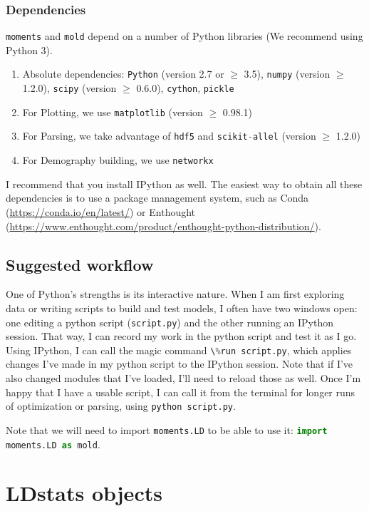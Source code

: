 \documentclass[10pt]{article}
\makeatletter
\renewcommand{\cite}{\citep}
\newcommand{\mold}{\texttt{mold}\xspace}
\newcommand{\py}[1]{\lstinline[breaklines=true,language=Python, showstringspaces=False]@#1@}
\makeatother
\begin{document}
\subsubsection{Dependencies}

\py{moments} and \mold depend on a number of Python libraries (We recommend using Python 3).

\begin{enumerate}
\item Absolute dependencies: \py{Python} (version 2.7 or $\geq$ 3.5), \py{numpy} (version $\geq$ 1.2.0), \py{scipy} (version $\geq$ 0.6.0), \py{cython}, \py{pickle}
\item For Plotting, we use \py{matplotlib} (version $\geq$ 0.98.1)
\item For Parsing, we take advantage of \py{hdf5} and \py{scikit-allel} (version $\geq$ 1.2.0) \cite{}
\item For Demography building, we use \py{networkx}
\end{enumerate}

I recommend that you install IPython as well.
The easiest way to obtain all these dependencies is to use a package management system, such as Conda (\url{https://conda.io/en/latest/}) or Enthought (\url{https://www.enthought.com/product/enthought-python-distribution/}).


\subsection{Suggested workflow}

One of Python's strengths is its interactive nature.
When I am first exploring data or writing scripts to build and test models, I often have two windows open: one editing a python script (\py{script.py}) and the other running an IPython session.
That way, I can record my work in the python script and test it as I go.
Using IPython, I can call the magic command \py{\%run script.py}, which applies changes I've made in my python script to the IPython session.
Note that if I've also changed modules that I've loaded, I'll need to reload those as well.
Once I'm happy that I have a usable script, I can call it from the terminal for longer runs of optimization or parsing, using \py{python script.py}.

Note that we will need to import \py{moments.LD} to be able to use it: \py{import moments.LD as mold}.

\section{LDstats objects}
\end{document}
